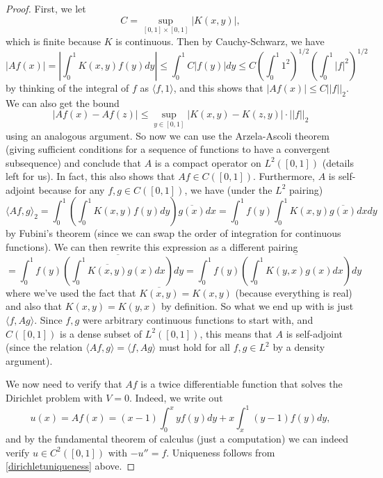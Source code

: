 \begin{proof}
First, we let 
\[
    C = \sup_{[0, 1] \times [0, 1]} |K(x, y)|,
\]
which is finite because $K$ is continuous. Then by Cauchy-Schwarz, we have
\[
    |Af(x)| = \left|\int_0^1 K(x, y) f(y) dy \right| \le \int_0^1 C|f(y)| dy \le C \left(\int_0^1 1^2\right)^{1/2} \left(\int_0^1 |f|^2\right)^{1/2}
\]
by thinking of the integral of $f$ as $\langle f, 1 \rangle$, and this shows that $|Af(x)| \le C||f||_2$. We can also get the bound 
\[
    |Af(x) - Af(z)| \le \sup_{y \in [0, 1]} |K(x, y) - K(z, y)| \cdot ||f||_2
\]
using an analogous argument. So now we can use the Arzela-Ascoli theorem (giving sufficient conditions for a sequence of functions to have a convergent subsequence) and conclude that $A$ is a compact operator on $L^2([0, 1])$ (details left for us). In fact, this also shows that $Af \in C([0, 1])$. Furthermore, $A$ is self-adjoint because for any $f, g \in C([0, 1])$, we have (under the $L^2$ pairing)
\[
    \langle Af, g \rangle_2 = \int_0^1 \left(\int_0^1 K(x, y) f(y) dy \right) \overline{g(x)} dx = \int_0^1 f(y) \int_0^1 K(x, y) \overline{g(x)} dx dy
\]
by Fubini's theorem (since we can swap the order of integration for continuous functions). We can then rewrite this expression as a different pairing
\[
    = \int_0^1 f(y) \overline{\left(\int_0^1 \overline{K(x, y)} g(x) dx \right)}dy = \int_0^1 f(y) \overline{\left(\int_0^1 K(y, x) g(x) dx \right)}dy
\]
where we've used the fact that $\overline{K(x, y)} = K(x, y)$ (because everything is real) and also that $K(x, y) = K(y, x)$ by definition. So what we end up with is just $\langle f, Ag \rangle$. Since $f, g$ were arbitrary continuous functions to start with, and $C([0, 1])$ is a dense subset of $L^2([0, 1])$, this means that $A$ is self-adjoint (since the relation $\langle Af, g \rangle = \langle f, Ag \rangle$ must hold for all $f, g \in L^2$ by a density argument).

We now need to verify that $Af$ is a twice differentiable function that solves the Dirichlet problem with $V = 0$. Indeed, we write out
\[
    u(x) = Af(x) = (x-1) \int_0^x yf(y) dy + x \int_x^1 (y-1) f(y) dy,
\]
and by the fundamental theorem of calculus (just a computation) we can indeed verify $u \in C^2([0, 1])$ with $-u'' = f$. Uniqueness follows from \cref{dirichletuniqueness} above.
\end{proof}

